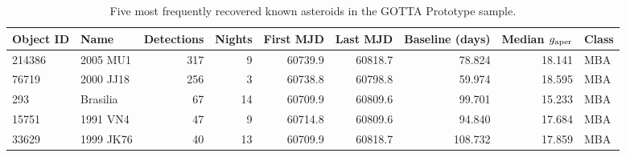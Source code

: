 \begin{table}
\centering
\caption{Five most frequently recovered known asteroids in the GOTTA Prototype sample.}
\label{tab:most_observed_objects}
\scriptsize
\setlength{\tabcolsep}{3.5pt}
\renewcommand{\arraystretch}{1.12}
\begin{tabular}{llrrrrrrl}
\toprule
Object ID & Name & Detections & Nights & First MJD & Last MJD & Baseline (days) & Median $g_{\rm aper}$ & Class \\
\midrule
214386 & 2005 MU1 & 317 & 9 & 60739.9 & 60818.7 & 78.824 & 18.141 & MBA \\
76719 & 2000 JJ18 & 256 & 3 & 60738.8 & 60798.8 & 59.974 & 18.595 & MBA \\
293 & Brasilia & 67 & 14 & 60709.9 & 60809.6 & 99.701 & 15.233 & MBA \\
15751 & 1991 VN4 & 47 & 9 & 60714.8 & 60809.6 & 94.840 & 17.684 & MBA \\
33629 & 1999 JK76 & 40 & 13 & 60709.9 & 60818.7 & 108.732 & 17.859 & MBA \\
\bottomrule
\end{tabular}
\end{table}
